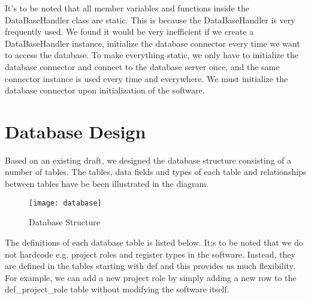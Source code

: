 It’s to be noted that all member variables and functions inside the DataBaseHandler class are static. This is because the DataBaseHandler is very frequently used. We found it would be very inefficient if we create a DataBaseHandler instance, initialize the database connector every time we want to access the database. To make everything static, we only have to initialize the database connector and connect to the database server once, and the same connector instance is used every time and everywhere. We must initialize the database connector upon initialization of the software.

\section{Database Design}
Based on an existing draft, we designed the database structure consisting of a number of tables. The tables, data fields and types of each table and relationships between tables have be been illustrated in the diagram. 

\begin{figure}[htbp]
\centering
\texttt{[image: database]}
\caption{Database Structure\label{fig:Database Structure}}
\end{figure}

The definitions of each database table is listed below. It;s to be noted that we do not hardcode e.g. project roles and register types in the software. Instead, they are defined in the tables starting with def and this provides us much flexibility. For example, we can add a new project role by simply adding a new row to the def\_project\_role table without modifying the software itself.

